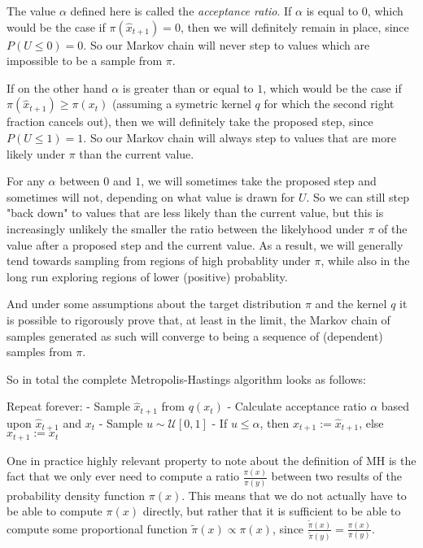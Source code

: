 The value $\alpha$ defined here is called the \textit{acceptance ratio}. If $\alpha$ is equal to $0$, which would be the case if $\pi(\hat{x}_{t+1}) = 0$, then we will definitely remain in place, since $P(U \le 0) = 0$. So our Markov chain will never step to values which are impossible to be a sample from $\pi$.

If on the other hand $\alpha$ is greater than or equal to $1$, which would be the case if $\pi(\hat{x}_{t+1}) \ge {\pi(x_t)}$ (assuming a symetric kernel $q$ for which the second right fraction cancels out), then we will definitely take the proposed step, since $P(U \le 1) = 1$. So our Markov chain will always step to values that are more likely under $\pi$ than the current value.

For any $\alpha$ between $0$ and $1$, we will sometimes take the proposed step and sometimes will not, depending on what value is drawn for $U$. So we can still step "back down" to values that are less likely than the current value, but this is increasingly unlikely the smaller the ratio between the likelyhood under $\pi$ of the value after a proposed step and the current value. As a result, we will generally tend towards sampling from regions of high probablity under $\pi$, while also in the long run exploring regions of lower (positive) probablity.

And under some assumptions about the target distribution $\pi$ and the kernel $q$ it is possible to rigorously prove that, at least in the limit, the Markov chain of samples generated as such will converge to being a sequence of (dependent) samples from $\pi$.

So in total the complete Metropolis-Hastings algorithm looks as follows:

Repeat forever:
  - Sample $\hat{x}_{t+1}$ from $q(x_t)$
  - Calculate acceptance ratio $\alpha$ based upon $\hat{x}_{t+1}$ and $x_t$
  - Sample $u \sim \mathcal{U}[0,1]$
  - If $u \le \alpha$, then $x_{t+1} := \hat{x}_{t+1}$, else $x_{t+1} := x_t$

One in practice highly relevant property to note about the definition of MH is the fact that we only ever need to compute a ratio $\frac{\pi(x)}{\pi(y)}$ between two results of the probability density function $\pi(x)$. This means that we do not actually have to be able to compute $\pi(x)$ directly, but rather that it is sufficient to be able to compute some proportional function $\tilde{\pi}(x) \propto \pi(x)$, since $\frac{\tilde{\pi}(x)}{\tilde{\pi}(y)} = \frac{\pi(x)}{\pi(y)}$.

